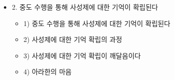 \documentclass[	17pt, 
							a1paper, 
							portrait, %
							margin=0mm, %
							innermargin=10mm,  		%
							colspace=5mm, 
							subcolspace=0mm
							]{tikzposter}
\begin{document}
\begin{columns}
{\begin{itemize}
					\item 2. 중도 수행을 통해 사성제에 대한 기억이 확립된다
						\begin{itemize}
						\item 1) 중도 수행을 통해 사성제에 대한 기억이 확립된다
						\item 2) 사성제에 대한 기억 확립의 과정
						\item 3) 사성제에 대한 기억 확립이 깨달음이다
						\item 4) 아라한의 마음
						\end{itemize}

					\end{itemize}
			}








	\end{columns}
\end{document}
